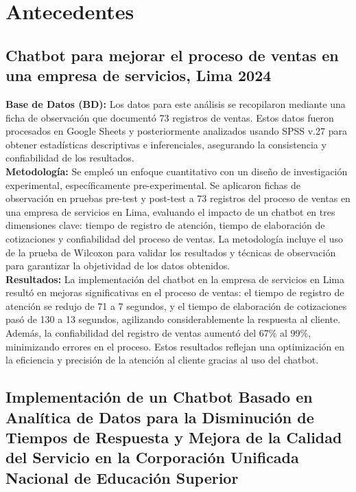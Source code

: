 \documentclass[10pt,a4paper]{article}
\begin{document}
	
	\section{Antecedentes}
		    
	\subsection{Chatbot para mejorar el proceso de ventas en una empresa de servicios, Lima 2024}

\textbf{Base de Datos (BD):} Los datos para este análisis se recopilaron mediante una ficha de observación que documentó 73 registros de ventas. Estos datos fueron procesados en Google Sheets y posteriormente analizados usando SPSS v.27 para obtener estadísticas descriptivas e inferenciales, asegurando la consistencia y confiabilidad de los resultados. \\

\textbf{Metodología:} Se empleó un enfoque cuantitativo con un diseño de investigación experimental, específicamente pre-experimental. Se aplicaron fichas de observación en pruebas pre-test y post-test a 73 registros del proceso de ventas en una empresa de servicios en Lima, evaluando el impacto de un chatbot en tres dimensiones clave: tiempo de registro de atención, tiempo de elaboración de cotizaciones y confiabilidad del proceso de ventas. La metodología incluye el uso de la prueba de Wilcoxon para validar los resultados y técnicas de observación para garantizar la objetividad de los datos obtenidos. \\

\textbf{Resultados:} La implementación del chatbot en la empresa de servicios en Lima resultó en mejoras significativas en el proceso de ventas: el tiempo de registro de atención se redujo de 71 a 7 segundos, y el tiempo de elaboración de cotizaciones pasó de 130 a 13 segundos, agilizando considerablemente la respuesta al cliente. Además, la confiabilidad del registro de ventas aumentó del 67\% al 99\%, minimizando errores en el proceso. Estos resultados reflejan una optimización en la eficiencia y precisión de la atención al cliente gracias al uso del chatbot. \\


\subsection{Implementación de un Chatbot Basado en Analítica de Datos para la Disminución de Tiempos de Respuesta y Mejora de la Calidad del Servicio en la Corporación Unificada Nacional de Educación Superior}
\end{document}

